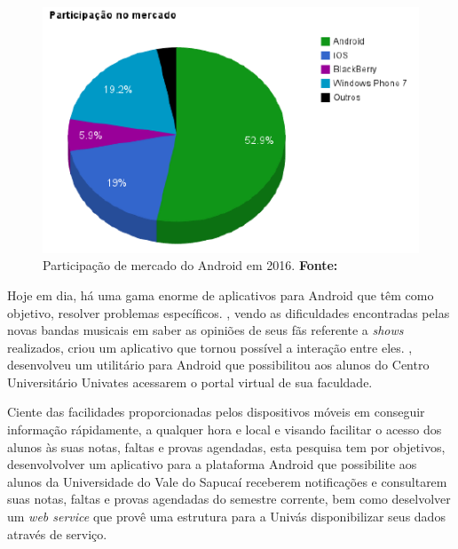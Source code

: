 	\begin{figure}[h!]
		\centerline{\includegraphics[scale=1]{./imagens/0_introducao/introducao.png}}
		\caption[Participação de mercado do Android em 2016]{Participação de
		mercado do Android em 2016.
		\textbf{Fonte:}}
		\label{fig:intro}
	\end{figure}

	\par Hoje em dia, há uma gama enorme de aplicativos para Android que têm como
objetivo, resolver problemas específicos. , vendo as
dificuldades encontradas pelas novas bandas musicais em saber as opiniões de
seus fãs referente a \textit{shows} realizados, criou um aplicativo que tornou
possível a interação entre eles. , desenvolveu um
utilitário para Android que possibilitou aos alunos do Centro Universitário
Univates acessarem o portal virtual de sua faculdade.


	\par Ciente das facilidades proporcionadas pelos dispositivos móveis em
conseguir informação rápidamente, a qualquer hora e local e visando facilitar
o acesso dos alunos às suas notas, faltas e provas agendadas, esta pesquisa tem
por objetivos, desenvolvolver um aplicativo para a plataforma Android que
possibilite aos alunos da Universidade do Vale do Sapucaí receberem
notificações e consultarem suas notas, faltas e provas agendadas do semestre
corrente, bem como deselvolver um \textit{web service} que provê uma estrutura
para a Univás disponibilizar seus dados através de serviço.

	
